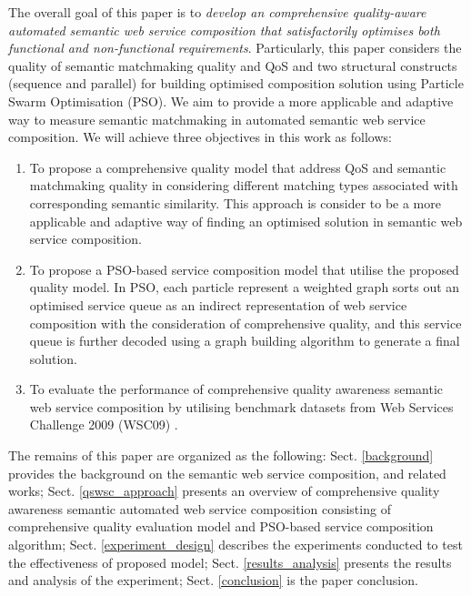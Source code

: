 \documentclass{llncs}
\begin{document}
The overall goal of this paper is to \textit{develop an comprehensive quality-aware automated semantic web service composition that satisfactorily optimises both functional and non-functional requirements}. Particularly, this paper considers the quality of semantic matchmaking quality and QoS and two structural constructs (sequence and parallel) for building optimised composition solution using Particle Swarm Optimisation (PSO). We aim to provide a more applicable and adaptive way to measure semantic matchmaking in automated semantic web service composition. We will achieve three objectives in this work as follows:

\begin{enumerate}
 \item To propose a comprehensive quality model that address QoS and semantic matchmaking quality in considering different matching types associated with corresponding semantic similarity. This approach is consider to be a more applicable and adaptive way of finding an optimised solution in semantic web service composition.
  
 \item To propose a PSO-based service composition model that utilise the proposed quality model. In PSO, each particle represent a weighted graph sorts out an optimised service queue as an indirect representation of web service composition with the consideration of comprehensive quality, and this service queue is further decoded using a graph building algorithm to generate a final solution.
  
 \item To evaluate the performance of comprehensive quality awareness semantic web service composition by utilising benchmark datasets from Web Services Challenge 2009 (WSC09) \cite{kona2009wsc}.
\end{enumerate}

The remains of this paper are organized as the following: Sect. \ref{background} provides the background on the semantic web service composition, and related works; Sect. \ref{qswsc_approach} presents an overview of comprehensive quality awareness semantic automated web service composition consisting of comprehensive quality evaluation model and PSO-based service composition algorithm; Sect. \ref{experiment_design} describes the experiments conducted to test the effectiveness of proposed model; Sect. \ref{results_analysis} presents the results and analysis of the experiment; Sect. \ref{conclusion} is the paper conclusion.
\end{document}
